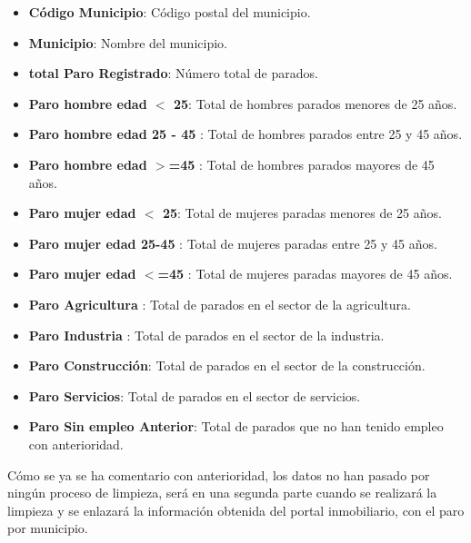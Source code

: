 \documentclass[a4paper, 12pt]{article}
\begin{document}
\begin{itemize}
	\item \textbf{Código Municipio}: Código postal del municipio.
	\item \textbf{Municipio}: Nombre del municipio.
	\item \textbf{total Paro Registrado}: Número total de parados.
	\item \textbf{Paro hombre edad $<$ 25}: Total de hombres parados menores de 25 años.
	\item \textbf{Paro hombre edad 25 - 45 }: Total de hombres parados entre 25 y 45 años.
	\item \textbf{Paro hombre edad $>$=45 }: Total de hombres parados mayores de 45 años.	
	\item \textbf{Paro mujer edad $<$ 25}: Total de mujeres paradas menores de 25 años.
	\item \textbf{Paro mujer edad 25-45 }: Total de mujeres paradas entre 25 y 45 años.
	\item \textbf{Paro mujer edad $<$=45 }: Total de mujeres paradas mayores de 45 años.	
	\item \textbf{Paro Agricultura }: Total de parados en el sector de la agricultura.
	\item \textbf{Paro Industria }: Total de parados en el sector de la industria.
	\item \textbf{Paro Construcción}: Total de parados en el sector de la construcción.
	\item \textbf{Paro Servicios}: Total de parados en el sector de servicios.
	\item \textbf{Paro Sin empleo Anterior}: Total de parados que no han tenido empleo con anterioridad.
	
\end{itemize}

Cómo se ya se ha comentario con anterioridad, los datos no han pasado por ningún proceso de limpieza, será en una segunda parte cuando se realizará la limpieza y se enlazará la información obtenida del portal inmobiliario, con el paro por municipio.
\end{document}
